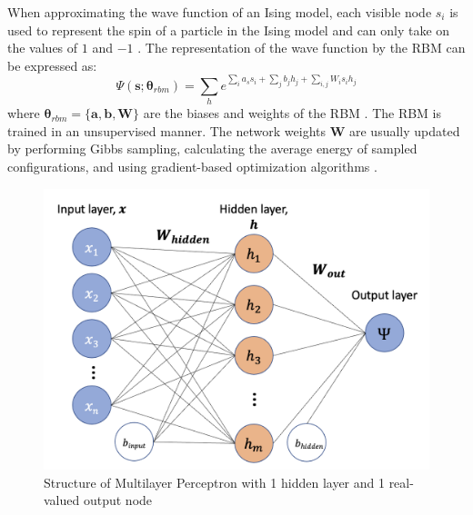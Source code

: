 When approximating the wave function of an Ising model, each visible node $s_i$ is used to represent the spin of a particle in the Ising model and can only take on the values of $1$ and $-1$ \cite{b20}. The representation of the wave function by the RBM can be expressed as:
\begin{equation}
    \Psi(\boldsymbol{s} ; \boldsymbol{\theta}_{rbm}) = \sum_{h} e^{\sum_i a_s s_i + \sum_j b_j h_j + \sum_{i,j}W_i s_i h_j} 
\end{equation}
where  $\boldsymbol{\theta}_{rbm} = \{\boldsymbol{a}, \boldsymbol{b}, \boldsymbol{W}\}$ are the biases and weights of the RBM \cite{b20}. The RBM is trained in an unsupervised manner. The network weights $\mathbf{W}$ are usually updated by performing Gibbs sampling, calculating the average energy of sampled configurations, and using gradient-based optimization algorithms \cite{b25}.

\begin{figure}[h!]
    \centering
    \includegraphics[width=0.7\linewidth]{images/mlp_diagram.png}
    \caption{Structure of Multilayer Perceptron with 1 hidden layer and 1 real-valued output node}
    \label{rbmstructure}
\end{figure}

